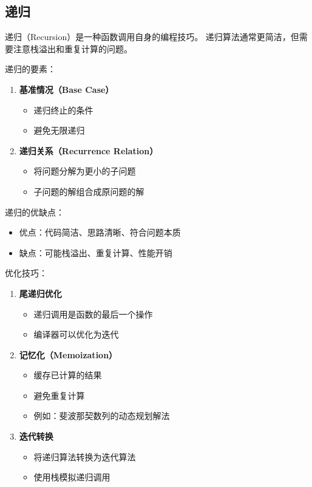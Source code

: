 \subsection{递归}


递归（Recursion）是一种函数调用自身的编程技巧。
递归算法通常更简洁，但需要注意栈溢出和重复计算的问题。

递归的要素：
\begin{enumerate}
  \item \textbf{基准情况（Base Case）}
    \begin{itemize}
      \item 递归终止的条件
      \item 避免无限递归
    \end{itemize}

  \item \textbf{递归关系（Recurrence Relation）}
    \begin{itemize}
      \item 将问题分解为更小的子问题
      \item 子问题的解组合成原问题的解
    \end{itemize}
\end{enumerate}

递归的优缺点：
\begin{itemize}
  \item 优点：代码简洁、思路清晰、符合问题本质
  \item 缺点：可能栈溢出、重复计算、性能开销
\end{itemize}

优化技巧：
\begin{enumerate}
  \item \textbf{尾递归优化}
    \begin{itemize}
      \item 递归调用是函数的最后一个操作
      \item 编译器可以优化为迭代
    \end{itemize}

  \item \textbf{记忆化（Memoization）}
    \begin{itemize}
      \item 缓存已计算的结果
      \item 避免重复计算
      \item 例如：斐波那契数列的动态规划解法
    \end{itemize}

  \item \textbf{迭代转换}
    \begin{itemize}
      \item 将递归算法转换为迭代算法
      \item 使用栈模拟递归调用
    \end{itemize}
\end{enumerate}

